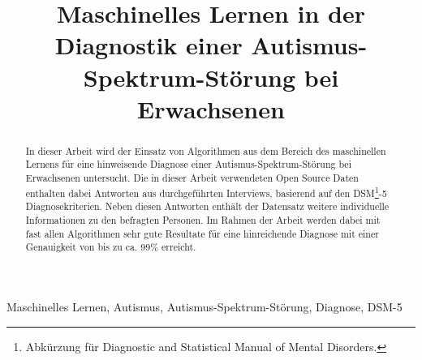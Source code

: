 \documentclass[conference]{IEEEtran}
\begin{document}
\title{Maschinelles Lernen in der Diagnostik einer Autismus-Spektrum-Störung bei Erwachsenen}

\author{
}

\maketitle

\begin{abstract}
In dieser Arbeit wird der Einsatz von Algorithmen aus dem Bereich des maschinellen Lernens für eine hinweisende Diagnose einer Autismus-Spektrum-Störung bei Erwachsenen untersucht. Die in dieser Arbeit verwendeten Open Source Daten enthalten dabei Antworten aus durchgeführten Interviews, basierend auf den DSM\footnote{\label{foot:1}Abkürzung für \glqq Diagnostic and Statistical Manual of Mental Disorders\grqq{}.}-5 Diagnosekriterien. Neben diesen Antworten enthält der Datensatz weitere individuelle Informationen zu den befragten Personen. Im Rahmen der Arbeit werden dabei mit fast allen Algorithmen sehr gute Resultate für eine hinreichende Diagnose mit einer Genauigkeit von bis zu ca. 99\% erreicht.
\end{abstract}

\begin{IEEEkeywords}
Maschinelles Lernen, Autismus, Autismus-Spektrum-Störung, Diagnose, DSM-5
\end{IEEEkeywords}













\printbibliography
\end{document}
